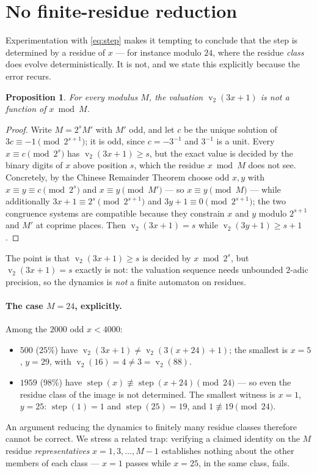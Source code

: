 \documentclass[11pt,a4paper]{article}
\theoremstyle{plain}
\newtheorem{proposition}[theorem]{Proposition}
\theoremstyle{definition}
\newcommand{\val}{\operatorname{v}_2}
\newcommand{\step}{\operatorname{step}}
\begin{document}
\section{No finite-residue reduction}\label{sec:nofinite}

Experimentation with \eqref{eq:step} makes it tempting to conclude that the step is
determined by a residue of $x$ --- for instance modulo $24$, where the residue \emph{class}
does evolve deterministically. It is not, and we state this explicitly because the error
recurs.

\begin{proposition}\label{prop:nofinite}
For every modulus $M$, the valuation $\val(3x+1)$ is \emph{not} a function of $x\bmod M$.
\end{proposition}
\begin{proof}
Write $M=2^{s}M'$ with $M'$ odd, and let $c$ be the unique solution of $3c\equiv-1
\pmod{2^{s+1}}$; it is odd, since $c=-3^{-1}$ and $3^{-1}$ is a unit. Every $x\equiv c
\pmod{2^{s}}$ has $\val(3x+1)\ge s$, but the exact value is decided by the binary digits of
$x$ above position $s$, which the residue $x\bmod M$ does not see. Concretely, by the Chinese
Remainder Theorem choose odd $x,y$ with $x\equiv y\equiv c\pmod{2^{s}}$ and $x\equiv y
\pmod{M'}$ --- so $x\equiv y\pmod M$ --- while additionally $3x+1\equiv2^{s}\pmod{2^{s+1}}$
and $3y+1\equiv0\pmod{2^{s+1}}$; the two congruence systems are compatible because they
constrain $x$ and $y$ modulo $2^{s+1}$ and $M'$ at coprime places. Then $\val(3x+1)=s$ while
$\val(3y+1)\ge s+1$.
\end{proof}

\noindent The point is that $\val(3x+1)\ge s$ is decided by $x\bmod 2^{s}$, but $\val(3x+1)=s$
exactly is not: the valuation sequence needs unbounded $2$-adic precision, so the dynamics is
\emph{not} a finite automaton on residues.

\paragraph{The case $M=24$, explicitly.} Among the $2000$ odd $x<4000$:
\begin{itemize}[nosep]
  \item $500$ ($25\%$) have $\val(3x+1)\ne\val(3(x+24)+1)$; the smallest is $x=5$, $y=29$,
        with $\val(16)=4\ne3=\val(88)$.
  \item $1959$ ($98\%$) have $\step(x)\not\equiv\step(x+24)\pmod{24}$ --- so even the residue
        class of the image is not determined. The smallest witness is $x=1$, $y=25$:
        $\step(1)=1$ and $\step(25)=19$, and $1\not\equiv19\pmod{24}$.
\end{itemize}
An argument reducing the dynamics to finitely many residue classes therefore cannot be
correct. We stress a related trap: verifying a claimed identity on the $M$ residue
\emph{representatives} $x=1,3,\dots,M-1$ establishes nothing about the other members of each
class --- $x=1$ passes while $x=25$, in the same class, fails.
\end{document}
